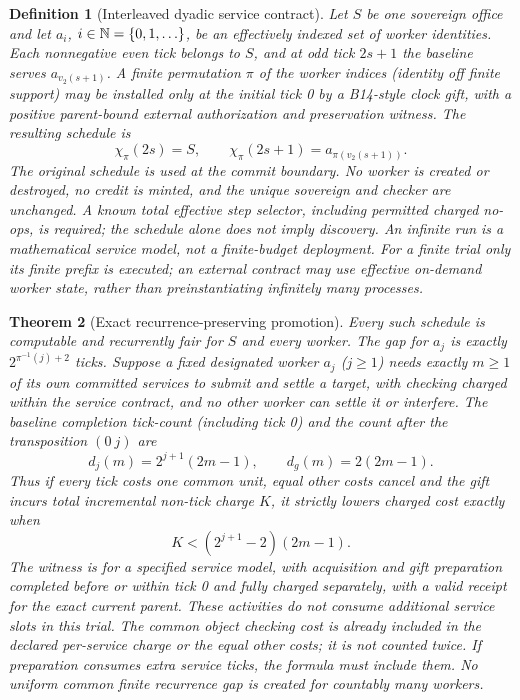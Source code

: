 \documentclass[11pt,letterpaper]{article}
\newtheorem{theorem}{Theorem}[section]\newtheorem{proposition}[theorem]{Proposition}\newtheorem{corollary}[theorem]{Corollary}\newtheorem{definition}[theorem]{Definition}
\begin{document}
\begin{definition}[Interleaved dyadic service contract]\label{def:clock}
Let $S$ be one sovereign office and let $a_i$, $i\in\mathbb N=\{0,1,\ldots\}$, be an effectively indexed set of worker identities. Each nonnegative even tick belongs to $S$, and at odd tick $2s+1$ the baseline serves $a_{v_2(s+1)}$. A finite permutation $\pi$ of the worker indices (identity off finite support) may be installed only at the initial tick 0 by a B14-style clock gift, with a positive parent-bound external authorization and preservation witness. The resulting schedule is
\[
 \chi_\pi(2s)=S,\qquad \chi_\pi(2s+1)=a_{\pi(v_2(s+1))}.
\]
The original schedule is used at the commit boundary. No worker is created or destroyed, no credit is minted, and the unique sovereign and checker are unchanged. A known total effective step selector, including permitted charged no-ops, is required; the schedule alone does not imply discovery. An infinite run is a mathematical service model, not a finite-budget deployment. For a finite trial only its finite prefix is executed; an external contract may use effective on-demand worker state, rather than preinstantiating infinitely many processes.
\end{definition}
\begin{theorem}[Exact recurrence-preserving promotion]\label{thm:clock}
Every such schedule is computable and recurrently fair for $S$ and every worker. The gap for $a_j$ is exactly $2^{\pi^{-1}(j)+2}$ ticks. Suppose a fixed designated worker $a_j$ ($j\ge1$) needs exactly $m\ge1$ of its own committed services to submit and settle a target, with checking charged within the service contract, and no other worker can settle it or interfere. The baseline completion tick-count (including tick 0) and the count after the transposition $(0\ j)$ are
\[
 d_j(m)=2^{j+1}(2m-1),\qquad d_g(m)=2(2m-1).
\]
Thus if every tick costs one common unit, equal other costs cancel and the gift incurs total incremental non-tick charge $K$, it strictly lowers charged cost exactly when
\[
 K<(2^{j+1}-2)(2m-1).
\]
The witness is for a specified service model, with acquisition and gift preparation completed before or within tick 0 and fully charged separately, with a valid receipt for the exact current parent. These activities do not consume additional service slots in this trial. The common object checking cost is already included in the declared per-service charge or the equal other costs; it is not counted twice. If preparation consumes extra service ticks, the formula must include them. No uniform common finite recurrence gap is created for countably many workers.
\end{theorem}
\end{document}
